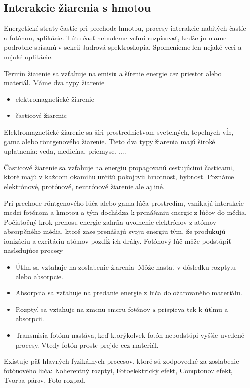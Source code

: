\documentclass[../../main.tex]{subfiles}
\begin{document}
\subsection{Interakcie žiarenia s hmotou} 
Energetické straty častíc pri prechode hmotou, procesy interakcie nabitých častíc a fotónou, aplikácie. Túto časť nebudeme veľmi rozpisovať, keďže ju mame podrobne spísanú v sekcii Jadrová spektroskopia. Spomenieme len nejaké veci a nejaké aplikácie.
\newline

Termín žiarenie sa vzťahuje na emisiu a šírenie energie cez priestor alebo materiál. Máme dva typy žiarenie
\begin{itemize}
\item elektromagnetické žiarenie
\item časticové žiarenie
\end{itemize}

Elektromagnetické žiarenie sa šíri prostredníctvom svetelných, tepelných vĺn, gama alebo röntgenového žiarenie. Tieto dva typy žiarenia majú široké uplatnenia: veda, medicína, priemysel .... 

Časticové žiarenie sa vzťahuje na energiu propagovanú cestujúcimi časticami, ktoré majú v každom okamihu určitú pokojovú hmotnosť, hybnosť. Poznáme elektrónové, protónové, neutrónové žiarenie ale aj iné.

Pri prechode röntgenového lúča alebo gama lúča prostredím, vznikajú interakcie medzi fotónom a hmotou a tým dochádza k prenášaniu energie z lúčov do média. Počiatočný krok prenosu energie zahŕňa uvoľnenie elektrónov z atómov absorpčného média, ktoré zase prenášajú svoju energiu tým, že produkujú ionizáciu a excitáciu atómov pozdĺž ich dráhy. Fotónový lúč môže podstúpiť nasledujúce procesy
\begin{itemize}
\item Útlm sa vzťahuje na zoslabenie žiarenia. Môže nastať v dôsledku rozptylu alebo absorpcie.
\item Absorpcia sa vzťahuje na predanie energie z lúča do ožarovaného materiálu.
\item Rozptyl sa vzťahuje na zmenu smeru fotónov a prispieva tak k útlmu a absorpcii.
\item Transmisia fotónu nastáva, keď ktorýkoľvek fotón nepodstúpi vyššie uvedené procesy. Vtedy fotón proste prejde cez materiál.
\end{itemize}

Existuje päť hlavných fyzikálnych procesov, ktoré sú zodpovedné za zoslabenie fotónového lúča: Koherentný rozptyl, Fotoelektrický efekt, Comptonov efekt, Tvorba párov, Foto rozpad.
\end{document}
